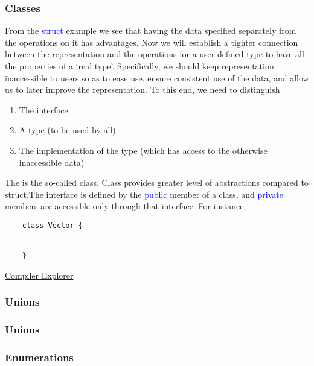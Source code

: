 \documentclass{article}
\newcommand{\be}[1]{\textcolor{blue}{#1}}
\begin{document}
\subsubsection{Classes}
From the \be{struct} example we see that having the data specified separately from the operations on it 
has advantages. Now we will establish a tighter connection between the representation and the operations for a user-defined type to have all the properties of a `real type'. Specifically, we should keep representation inaccessible to users so as to ease use, ensure consistent use of the data, and allow us to later improve the representation. To this end, we need to distinguish
\begin{enumerate}
	\item The interface
	\item A type (to be used by all)
	\item The implementation of the type (which has access to the otherwise inaccessible data)
\end{enumerate}
The is the so-called class. Class provides greater level of abstractions compared to struct.The interface is defined by the \be{public} member of a class, and \be{private} members are accessible only through that interface. For instance,
\begin{verbatim}
	class Vector {
	
	
	}
\end{verbatim}
\href{https://godbolt.org/z/E6M64s}{Compiler Explorer}
\subsubsection{Unions}

\subsubsection{Unions}

\subsubsection{Enumerations}
%
\end{document}
